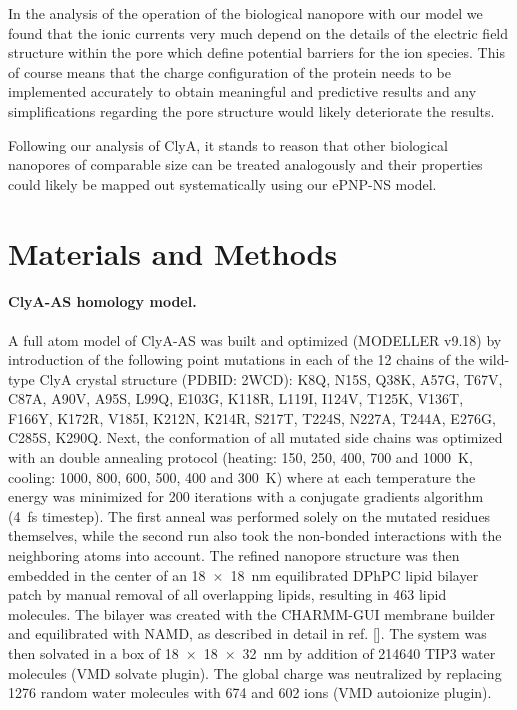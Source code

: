 \documentclass[journal=ancac3,manuscript=article,etalmode=truncate,maxauthors=0,layout=onecolumn]{achemso}
\begin{document}
In the analysis of the operation of the biological nanopore with our model we
found that the ionic currents very much depend on the details of the electric
field structure within the pore which define potential barriers for the ion
species. This of course means that the charge configuration of the protein needs
to be implemented accurately to obtain meaningful and predictive results and any
simplifications regarding the pore structure would likely deteriorate the
results.

Following our analysis of ClyA, it stands to reason that other biological
nanopores of comparable size can be treated analogously and their properties
could likely be mapped out systematically using our ePNP-NS model.


\section{Materials and Methods}\label{sec:methods}

\paragraph{ClyA-AS homology model.}
%
A full atom model of ClyA-AS\cite{Soskine-2013} was built and optimized
(MODELLER v9.18\cite{Sali-1993}) by introduction of the following point
mutations in each of the 12 chains of the wild-type ClyA crystal structure
(PDBID: 2WCD\cite{Mueller-2009}): K8Q, N15S, Q38K, A57G, T67V, C87A, A90V, A95S,
L99Q, E103G, K118R, L119I, I124V, T125K, V136T, F166Y, K172R, V185I, K212N,
K214R, S217T, T224S, N227A, T244A, E276G, C285S, K290Q. Next, the conformation
of all mutated side chains was optimized with an double annealing protocol
(heating: 150, 250, 400, 700 and \SI{1000}{\kelvin}, cooling: 1000, 800, 600,
500, 400 and \SI{300}{\kelvin}) where at each temperature the energy was
minimized for 200 iterations with a conjugate gradients algorithm (\SI{4}{\fs}
timestep).\cite{Shanno-1980} The first anneal was performed solely on the
mutated residues themselves, while the second run also took the non-bonded
interactions with the neighboring atoms into account. The refined nanopore
structure was then embedded in the center of an \SI{18x18}{\nm} equilibrated
DPhPC lipid bilayer patch by manual removal of all overlapping lipids, resulting
in 463 lipid molecules. The bilayer was created with the
CHARMM-GUI\cite{Jo-2008} membrane builder\cite{Lee-2016} and equilibrated with
NAMD\cite{Phillips-2005}, as described in detail in ref. [].
The system was then solvated in a box of \SI{18x18x32}{\nm} by addition of
214640 TIP3 water molecules (VMD solvate plugin). The global charge was
neutralized by replacing 1276 random water molecules with 674 \Na{} and 602
\Cl{} ions (VMD autoionize plugin).\cite{Humphrey-1996}
\end{document}
